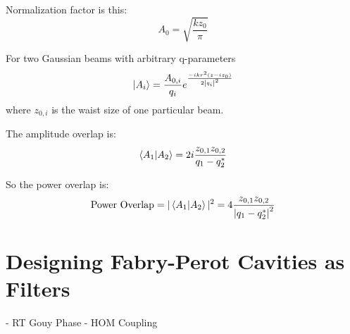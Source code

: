 \documentclass[oneside]{book}
\begin{document}
\begin{appendices}
	Normalization factor is this:
	\begin{equation}
	A_0 = \sqrt{\frac{k z_0}{\pi}}
	\end{equation}

	For two Gaussian beams with arbitrary q-parameters
	\begin{equation}
	\ket{A_i} = \frac{A_{0,i}}{q_i} e^{ \frac{-ikr^2(z-iz_0)}{2\abs{q_i}^2 }}
	\end{equation}
	where $z_{0,i}$ is the waist size of one particular beam.
	
	The amplitude overlap is:
	\begin{equation}
	\braket{A_1|A_2} = 2 i  \frac{ z_{0,1}z_{0,2}}{q_1 - q_2^*}
	\end{equation}
	
	So the power overlap is:
	\begin{equation}
	\text{Power Overlap} = \vert \braket{A_1|A_2} \vert^2 = 4 \frac{ z_{0,1}z_{0,2}}{\abs{q_1 - q_2^*}^2}
	\end{equation}

	\chapter{Designing Fabry-Perot Cavities as Filters}
	- RT Gouy Phase
	- HOM Coupling
\end{appendices} 

\medskip



\end{document}
